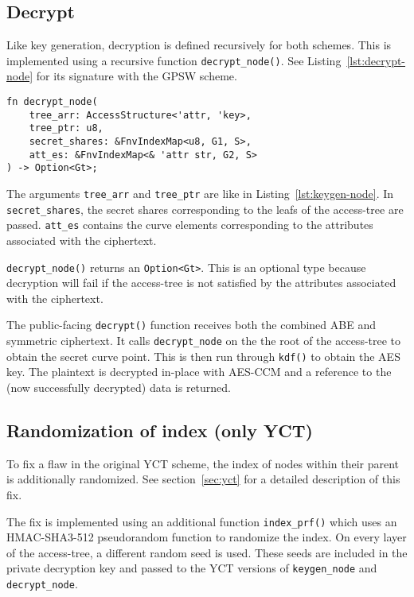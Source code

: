 \subsection{Decrypt}
Like key generation, decryption is defined recursively for both schemes.
This is implemented using a recursive function \verb+decrypt_node()+.
See Listing~\ref{lst:decrypt-node} for its signature with the GPSW scheme.

\begin{lstlisting}[float=h,caption={Function signature of recursive decryption},label={lst:decrypt-node}]
fn decrypt_node(
    tree_arr: AccessStructure<'attr, 'key>,
    tree_ptr: u8,
    secret_shares: &FnvIndexMap<u8, G1, S>,
    att_es: &FnvIndexMap<& 'attr str, G2, S>
) -> Option<Gt>;
\end{lstlisting}

The arguments \verb+tree_arr+ and \verb+tree_ptr+ are like in Listing~\ref{lst:keygen-node}.
In \verb+secret_shares+, the secret shares corresponding to the leafs of the \gls{access-tree} are passed.
\verb+att_es+ contains the curve elements corresponding to the attributes associated with the ciphertext.

\verb+decrypt_node()+ returns an \verb+Option<Gt>+.
This is an optional type because decryption will fail if the \gls{access-tree} is not satisfied by the attributes associated with the ciphertext.

The public-facing \verb+decrypt()+ function receives both the combined ABE and symmetric ciphertext. 
It calls \verb.decrypt_node. on the the root of the \gls{access-tree} to obtain the secret curve point.
This is then run through \verb+kdf()+ to obtain the AES key.
The plaintext is decrypted in-place with AES-CCM and a reference to the (now successfully decrypted) data is returned.

\subsection{Randomization of index (only YCT)}
To fix a flaw in the original YCT scheme, the index of nodes within their parent is additionally randomized.
See section~\ref{sec:yct} for a detailed description of this fix.

The fix is implemented using an additional function \verb+index_prf()+ which uses an HMAC-SHA3-512 pseudorandom function to randomize the index.
On every layer of the \gls{access-tree}, a different random seed is used. 
These seeds are included in the private decryption key and passed to the YCT versions of \verb+keygen_node+ and \verb+decrypt_node+.

